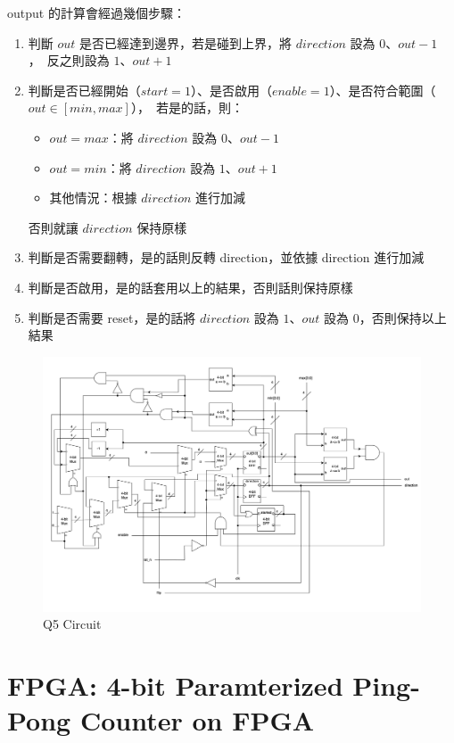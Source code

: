 \documentclass[10.5pt,compsoc,UTF8]{CjC}
\theoremstyle{mystyle}
\begin{document}
output 的計算會經過幾個步驟：
\begin{enumerate}
  \item 判斷 $out$ 是否已經達到邊界，若是碰到上界，將 $direction$ 設為 $0$、$out - 1$，\
  反之則設為 $1$、$out + 1$
  \item 判斷是否已經開始（$start = 1$）、是否啟用（$enable = 1$）、是否符合範圍（$out \in [min, max]$），\
  若是的話，則：
  \begin{itemize}
    \item $out = max$：將 $direction$ 設為 $0$、$out - 1$
    \item $out = min$：將 $direction$ 設為 $1$、$out + 1$
    \item 其他情況：根據 $direction$ 進行加減
  \end{itemize}
  否則就讓 $direction$ 保持原樣
  \item 判斷是否需要翻轉，是的話則反轉 direction，並依據 direction 進行加減
  \item 判斷是否啟用，是的話套用以上的結果，否則話則保持原樣
  \item 判斷是否需要 reset，是的話將 $direction$ 設為 $1$、$out$ 設為 $0$，否則保持以上結果
\end{enumerate}

\newpage

\begin{figure}[!h]
  \centering
  \includegraphics[width=\textwidth]{./img/Q5.png}
  \caption{Q5 Circuit}
  \label{fig:Q5}
\end{figure}


\newpage

\section{FPGA: 4-bit Paramterized Ping-Pong Counter on FPGA}
\end{document}
